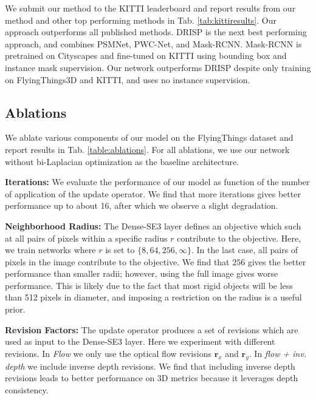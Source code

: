 \documentclass[final]{cvpr}
\begin{document}
We submit our method to the KITTI leaderboard and report results from our method and other top performing methods in Tab. \ref{tab:kittiresults}. Our approach outperforms all published methods. DRISP \cite{ma2019deep} is the next best performing approach, and combines PSMNet\cite{chang2018pyramid}, PWC-Net\cite{pwcnet}, and Mask-RCNN\cite{he2017mask}. Mask-RCNN is pretrained on Cityscapes and fine-tuned on KITTI using bounding box and instance mask supervision. Our network outperforms DRISP despite only training on FlyingThings3D and KITTI, and uses no instance supervision.


\subsection{Ablations}
\label{sec:ablations}

We ablate various components of our model on the FlyingThings dataset and report results in Tab. \ref{table:ablations}. For all ablations, we use our network without bi-Laplacian optimization as the baseline architecture.

\vspace{1mm} \noindent \textbf{Iterations:} We evaluate the performance of our model as function of the number of application of the update operator. We find that more iterations gives better performance up to about 16, after which we observe a slight degradation.

\vspace{1mm} \noindent \textbf{Neighborhood Radius:} The Dense-SE3 layer defines an objective which such at all pairs of pixels within a specific radius $r$ contribute to the objective. Here, we train networks where $r$ is set to $\{8, 64, 256, \infty\}$. In the last case, all pairs of pixels in the image contribute to the objective. We find that  $256$ gives the better performance than smaller radii; however, using the full image gives worse performance. This is likely due to the fact that most rigid objects will be less than 512 pixels in diameter, and imposing a restriction on the radius is a useful prior.

\vspace{1mm} \noindent \textbf{Revision Factors:} The update operator produces a set of revisions which are used as input to the Dense-SE3 layer. Here we experiment with different revisions. In \emph{Flow} we only use the optical flow revisions $\mathbf{r}_x$ and $\mathbf{r}_y$. In \emph{flow + inv. depth} we include inverse depth revisions. We find that including inverse depth revisions leads to better performance on 3D metrics because it leverages depth consistency.
\end{document}

